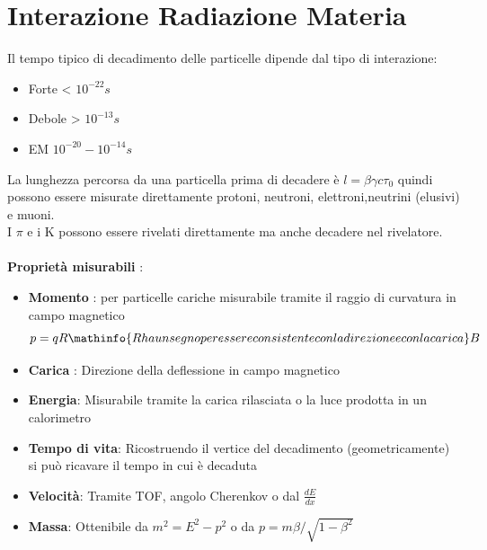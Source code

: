 \chapter{Interazione Radiazione Materia}
Il tempo tipico di decadimento delle particelle dipende dal tipo di interazione:
\begin{itemize}
    \item Forte  < $10^{-22}s$
    \item Debole > $10^{-13}s$
    \item EM $10^{-20}-10^{-14}s$
\end{itemize}
La lunghezza percorsa da una particella prima di decadere è $l=\beta \gamma c \tau_0$ quindi possono essere misurate direttamente protoni, neutroni, elettroni,neutrini (elusivi) e muoni.\\
I $\pi$ e i K possono essere rivelati direttamente ma anche decadere nel rivelatore.
\\
\\
\textbf{Proprietà misurabili} :
\begin{itemize}
    \item \textbf{Momento} : per particelle cariche misurabile tramite il raggio di curvatura in campo magnetico $$p=qR\mathinfo{R ha un segno per essere consistente con la direzione e con la carica}B$$

    \item \textbf{Carica} : Direzione della deflessione in campo magnetico
    \item \textbf{Energia}: Misurabile tramite la carica rilasciata o la luce prodotta in un calorimetro
    \item \textbf{Tempo di vita}: Ricostruendo il vertice del decadimento (geometricamente) si può ricavare il tempo in cui è decaduta
    \item \textbf{Velocità}: Tramite TOF, angolo Cherenkov o dal $\frac{dE}{dx}$
    \item \textbf{Massa}: Ottenibile da $m^2=E^2-p^2$ o da $p=m\beta/\sqrt{1-\beta^2} $
\end{itemize}

